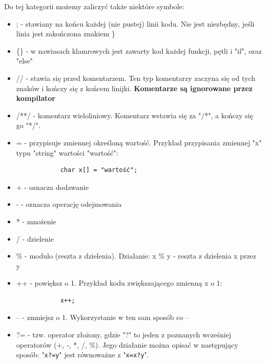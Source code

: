 \documentclass[a4paper,12pt, twoside]{article}
\begin{document}
	Do tej kategorii możemy zaliczyć także niektóre symbole:
	\begin{itemize}
		\item ; - stawiany na końcu każdej (nie pustej) linii kodu. Nie jest niezbędny, jeśli linia jest zakończona znakiem \}
		\item \{\} - w nawiasach klamrowych jest zawarty kod każdej funkcji, pętli i "if", oraz "else"
		\item // - stawia się przed komentarzem. Ten typ komentarzy zaczyna się od tych znaków i kończy się z końcem linijki. \textbf{Komentarze są ignorowane przez kompilator} 
		\item /**/ - komentarz wieloliniowy. Komentarz wstawia się za "/*", a kończy się go "*/".
		\item = - przypisuje zmiennej określoną wartość. Przykład przypisania zmiennej "x" typu "string" wartości "wartość":
			\begin{verbatim}
			char x[] = "wartość";
			\end{verbatim}
		\item + - oznacza dodawanie
		\item - - oznacza operację odejmowania
		\item * - mnożenie
		\item / - dzielenie
		\item \% - modulo (reszta z dzielenia). Działanie: x \% y - reszta z dzielenia x przez y
		\item ++ - powiększ o 1. Przykład kodu zwiększającego zmienną x o 1:
			\begin{verbatim}
			x++;
			\end{verbatim}
		\item -- - zmniejsz o 1. Wykorzystanie w ten sam sposób co --
		\item ?= - tzw. operator złożony, gdzie "?" to jeden z poznanych wcześniej operatorów (+, -, *, /, \%). Jego działanie można opisać w następujący sposób: "\verb|x?=y|" jest równoważne z "\verb|x=x?y|".
	\end{itemize}
\end{document}
